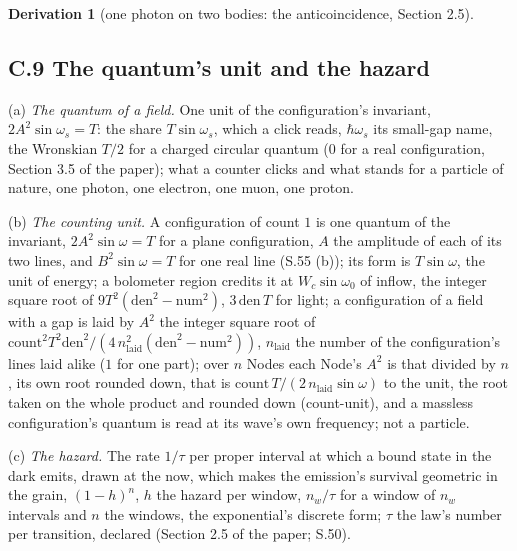 \documentclass[pdflatex,sn-mathphys-num]{sn-jnl}
\newcommand{\num}{\mathrm{num}}
\newcommand{\den}{\mathrm{den}}
\theoremstyle{thmstyleone}
\newtheorem{derivation}{Derivation}
\begin{document}
\begin{derivation}[one photon on two bodies: the anticoincidence, Section 2.5]
\end{derivation}

\subsection*{C.9 The quantum's unit and the hazard}

(a) \emph{The quantum of a field.} One unit of the configuration's invariant, $2A^2\sin\omega_s = T$: the share $T\sin\omega_s$, which a click reads, $\hbar\omega_s$ its small-gap name, the Wronskian $T / 2$ for a charged circular quantum ($0$ for a real configuration, Section 3.5 of the paper); what a counter clicks and what stands for a particle of nature, one photon, one electron, one muon, one proton.

(b) \emph{The counting unit.} A configuration of count $1$ is one quantum of the invariant, $2A^2\sin\omega = T$ for a plane configuration, $A$ the amplitude of each of its two lines, and $B^2\sin\omega = T$ for one real line (S.55 (b)); its form is $T\sin\omega$, the unit of energy; a bolometer region credits it at $W_c\sin\omega_0$ of inflow, the integer square root of $9T^2(\den^2 - \num^2)$, $3\,\den\,T$ for light; a configuration of a field with a gap is laid by $A^2$ the integer square root of $\text{count}^2 T^2 \den^2 / (4\,n_{\mathrm{laid}}^2 (\den^2 - \num^2))$, $n_{\mathrm{laid}}$ the number of the configuration's lines laid alike ($1$ for one part); over $n$ Nodes each Node's $A^2$ is that divided by $n$, its own root rounded down, that is $\text{count}\,T / (2\,n_{\mathrm{laid}}\sin\omega)$ to the unit, the root taken on the whole product and rounded down (count-unit), and a massless configuration's quantum is read at its wave's own frequency; not a particle.

(c) \emph{The hazard.} The rate $1 / \tau$ per proper interval at which a bound state in the dark emits, drawn at the now, which makes the emission's survival geometric in the grain, $(1 - h)^n$, $h$ the hazard per window, $n_w / \tau$ for a window of $n_w$ intervals and $n$ the windows, the exponential's discrete form; $\tau$ the law's number per transition, declared (Section 2.5 of the paper; S.50).
\end{document}

